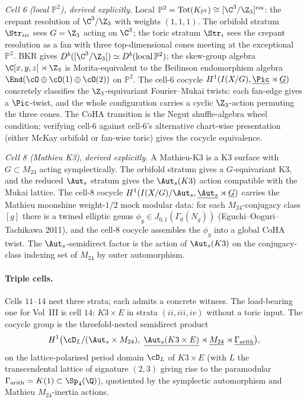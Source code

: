 \emph{Cell 6 (local $\mathbb{P}^{2}$), derived explicitly.} Local
$\mathbb{P}^{2}=\mathrm{Tot}(K_{\mathbb{P}^{2}})\cong
[\C^{3}/\Z_{3}]^{\mathrm{res}}$: the crepant resolution of
$\C^{3}/\Z_{3}$ with weights $(1,1,1)$. The orbifold stratum
$\Str_{iii}$ sees $G=\Z_{3}$ acting on $\C^{3}$; the toric stratum
$\Str_{i}$ sees the crepant resolution as a fan with three
top-dimensional cones meeting at the exceptional $\mathbb{P}^{2}$.
BKR gives $D^{b}([\C^{3}/\Z_{3}])\simeq D^{b}(\mathrm{local}\,
\mathbb{P}^{2})$; the skew-group algebra
$\C[x,y,z]\rtimes\Z_{3}$ is Morita-equivalent to the Beilinson
endomorphism algebra $\End(\cO\oplus\cO(1)\oplus\cO(2))$ on
$\mathbb{P}^{2}$. The cell-$6$ cocycle $H^{1}(I(X/G),\underline{\Pic}
\rtimes\underline{G})$ concretely classifies the $\Z_{3}$-equivariant
Fourier--Mukai twists: each fan-edge gives a $\Pic$-twist, and the
whole configuration carries a cyclic $\Z_{3}$-action permuting the
three cones. The CoHA transition is the Neguț shuffle-algebra wheel
condition; verifying cell-$6$ against cell-$6$'s alternative chart-wise
presentation (either McKay orbifold or fan-wise toric) gives the
cocycle equivalence.

\emph{Cell 8 (Mathieu K3), derived explicitly.} A Mathieu-K3 is a K3
surface with $G\subset M_{24}$ acting symplectically. The orbifold
stratum gives a $G$-equivariant K3, and the reduced $\Aut_{s}$
stratum gives the $\Aut_{s}(K3)$ action compatible with the Mukai
lattice. The cell-$8$ cocycle
$H^{1}(I(X/G)/\Aut_{s},\underline{\Aut_{s}}\rtimes\underline{G})$
carries the Mathieu moonshine weight-$1/2$ mock modular data: for
each $M_{24}$-conjugacy class $[g]$ there is a twined elliptic genus
$\phi_{g}\in J_{0,1}(\Gamma_{0}(N_{g}))$ (Eguchi--Ooguri--Tachikawa
2011), and the cell-$8$ cocycle assembles the $\phi_{g}$ into a
global CoHA twist. The $\Aut_{s}$-semidirect factor is the action of
$\Aut_{s}(K3)$ on the conjugacy-class indexing set of $M_{24}$
by outer automorphism.

\paragraph{Triple cells.} Cells $11$--$14$ nest three strata; each
admits a concrete witness. The load-bearing one for Vol~III is cell $14$:
$K3\times E$ in strata $(ii,iii,iv)$ without a toric input. The
cocycle group is the threefold-nested semidirect product
\[
H^{1}\bigl(\cD_{L}/(\Aut_{s}\times M_{24}),\;
\underline{\Aut_{s}(K3\times E)}\rtimes\underline{M_{24}}\rtimes
\underline{\Gamma_{\mathrm{arith}}}\bigr),
\]
on the lattice-polarised period domain $\cD_{L}$ of $K3\times E$
(with $L$ the transcendental lattice of signature $(2,3)$ giving
rise to the paramodular $\Gamma_{\mathrm{arith}} = K(1) \subset
\Sp_{4}(\Q)$), quotiented by the symplectic automorphism and
Mathieu $M_{24}$-inertia actions.

